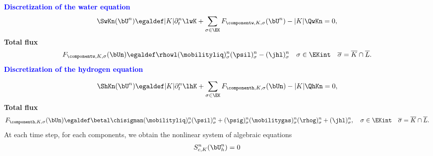 \documentclass[10 pt]{beamer}
\begin{document}
\begin{frame}
\textcolor{blue}{\textbf{Discretization of the water equation}}
\begin{equation*}
\SwKn(\bU^n) \egaldef |K| \partial_t^n \lwK  + \sum_{\sigma \in \EK} {F}_{\componentw,K,\sigma}(\bU^{n})- |K|\QwKn = 0,
\end{equation*}
\textcolor{cadmiumgreen}{\textbf{Total flux}}
\begin{equation*}
{F}_{\componentw,K,\sigma}(\bUn) \egaldef \rhowl (\mobilityliq)_{\sigma}^{n} (\psil)_{\sigma}^{n} - (\jhl)_{\sigma}^{n} \quad \sigma \in \EKint \quad \overline{\sigma} = \overline{K} \cap \overline{L}.
\end{equation*}
\pause
\textcolor{blue}{\textbf{Discretization of the hydrogen equation}}

\begin{equation*} 
\ShKn(\bU^n)\egaldef |K| \partial_t^n \lhK + \sum_{\sigma \in \EK} {F}_{\componenth,K,\sigma}(\bUn) - |K| \QhKn = 0,
\label{eq:mass:conservation:equation:hydrogen:green:formula}
\end{equation*}
\textcolor{cadmiumgreen}{\textbf{Total flux}}
\begin{equation*}
\label{eq:total:flux:across:sigma:hydrogen:component}
 {F}_{\componenth,K,\sigma}(\bUn) \egaldef \betal \chisigman (\mobilityliq)_{\sigma}^{n} (\psil)_{\sigma}^{n} + (\psig)_{\sigma}^{n} (\mobilitygas)_{\sigma}^{n} (\rhog)_{\sigma}^{n} + (\jhl)_{\sigma}^{n} , \quad \sigma \in \EKint \quad \overline{\sigma} = \overline{K} \cap \overline{L}.
\end{equation*}
\pause
At each time step, for each components, we obtain the nonlinear system of algebraic equations
\begin{equation*}
S_{c,K}^n(\bU_h^n)=0
\end{equation*}
\end{frame}
\end{document}

